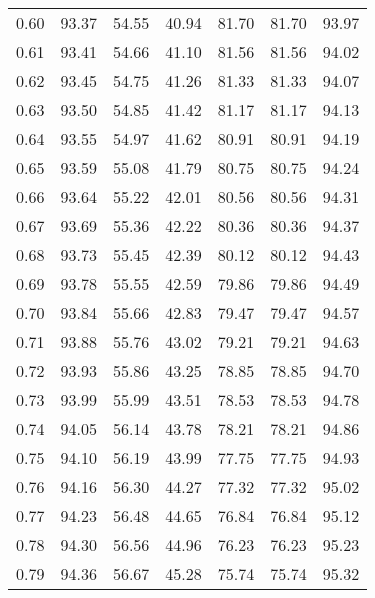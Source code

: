 \begin{tabular}{|c|c|c|c|c|c|c|}
      0.60 &     93.37 &     54.55 &      40.94 &   81.70 &      81.70 &         93.97 \\
      0.61 &     93.41 &     54.66 &      41.10 &   81.56 &      81.56 &         94.02 \\
      0.62 &     93.45 &     54.75 &      41.26 &   81.33 &      81.33 &         94.07 \\
      0.63 &     93.50 &     54.85 &      41.42 &   81.17 &      81.17 &         94.13 \\
      0.64 &     93.55 &     54.97 &      41.62 &   80.91 &      80.91 &         94.19 \\
      0.65 &     93.59 &     55.08 &      41.79 &   80.75 &      80.75 &         94.24 \\
      0.66 &     93.64 &     55.22 &      42.01 &   80.56 &      80.56 &         94.31 \\
      0.67 &     93.69 &     55.36 &      42.22 &   80.36 &      80.36 &         94.37 \\
      0.68 &     93.73 &     55.45 &      42.39 &   80.12 &      80.12 &         94.43 \\
      0.69 &     93.78 &     55.55 &      42.59 &   79.86 &      79.86 &         94.49 \\
      0.70 &     93.84 &     55.66 &      42.83 &   79.47 &      79.47 &         94.57 \\
      0.71 &     93.88 &     55.76 &      43.02 &   79.21 &      79.21 &         94.63 \\
      0.72 &     93.93 &     55.86 &      43.25 &   78.85 &      78.85 &         94.70 \\
      0.73 &     93.99 &     55.99 &      43.51 &   78.53 &      78.53 &         94.78 \\
      0.74 &     94.05 &     56.14 &      43.78 &   78.21 &      78.21 &         94.86 \\
      0.75 &     94.10 &     56.19 &      43.99 &   77.75 &      77.75 &         94.93 \\
      0.76 &     94.16 &     56.30 &      44.27 &   77.32 &      77.32 &         95.02 \\
      0.77 &     94.23 &     56.48 &      44.65 &   76.84 &      76.84 &         95.12 \\
      0.78 &     94.30 &     56.56 &      44.96 &   76.23 &      76.23 &         95.23 \\
      0.79 &     94.36 &     56.67 &      45.28 &   75.74 &      75.74 &         95.32 \\

\end{tabular}
